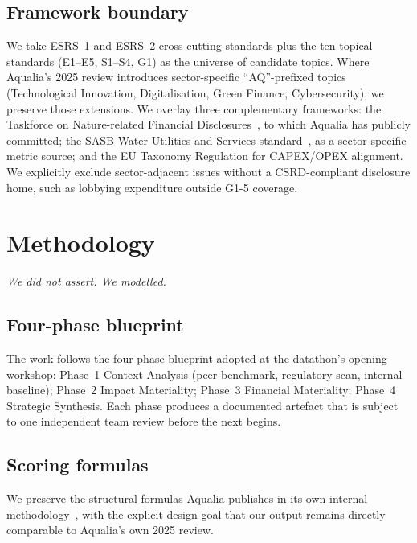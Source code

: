\documentclass[11pt, a4paper, twoside, openright]{scrreprt}
\begin{document}
\section{Framework boundary}

We take ESRS~1 and ESRS~2 cross-cutting standards plus the ten topical standards (E1--E5, S1--S4, G1) as the universe of candidate topics. Where Aqualia's 2025 review introduces sector-specific ``AQ''-prefixed topics (Technological Innovation, Digitalisation, Green Finance, Cybersecurity), we preserve those extensions. We overlay three complementary frameworks: the Taskforce on Nature-related Financial Disclosures~\cite{tnfd2023}, to which Aqualia has publicly committed; the SASB Water Utilities and Services standard~\cite{sasb2024}, as a sector-specific metric source; and the EU Taxonomy Regulation \cite{taxonomy2020} for CAPEX/OPEX alignment. We explicitly exclude sector-adjacent issues without a CSRD-compliant disclosure home, such as lobbying expenditure outside G1-5 coverage.

\chapter{Methodology}
\label{chap:methodology}

\epigraph{\itshape We did not assert. We modelled.}{}

\section{Four-phase blueprint}

The work follows the four-phase blueprint adopted at the datathon's opening workshop: Phase~1 Context Analysis (peer benchmark, regulatory scan, internal baseline); Phase~2 Impact Materiality; Phase~3 Financial Materiality; Phase~4 Strategic Synthesis. Each phase produces a documented artefact that is subject to one independent team review before the next begins.

\section{Scoring formulas}
\label{sec:scoring}

We preserve the structural formulas Aqualia publishes in its own internal methodology~\cite{aqualiaMethodology2025}, with the explicit design goal that our output remains directly comparable to Aqualia's own 2025 review.
\end{document}

